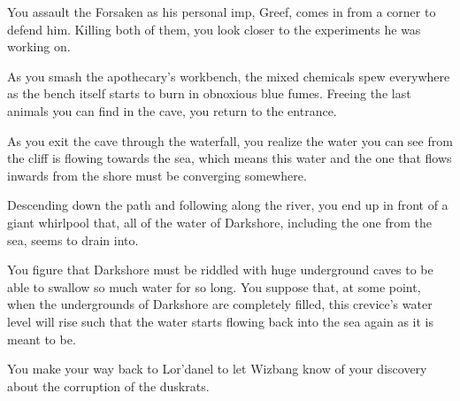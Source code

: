 
You assault the Forsaken as his personal imp, Greef, comes in from a corner to defend him. Killing both of them, you look closer to the experiments he was working on.


As you smash the apothecary's workbench, the mixed chemicals spew everywhere as the bench itself starts to burn in obnoxious blue fumes. Freeing the last animals you can find in the cave, you return to the entrance.

As you exit the cave through the waterfall, you realize the water you can see from the cliff is flowing towards the sea, which means this water and the one that flows inwards from the shore must be converging somewhere.

Descending down the path and following along the river, you end up in front of a giant whirlpool that, all of the water of Darkshore, including the one from the sea, seems to drain into.


You figure that Darkshore must be riddled with huge underground caves to be able to swallow so much water for so long. You suppose that, at some point, when the undergrounds of Darkshore are completely filled, this crevice's water level will rise such that the water starts flowing back into the sea again as it is meant to be.

You make your way back to Lor'danel to let Wizbang know of your discovery about the corruption of the duskrats.

